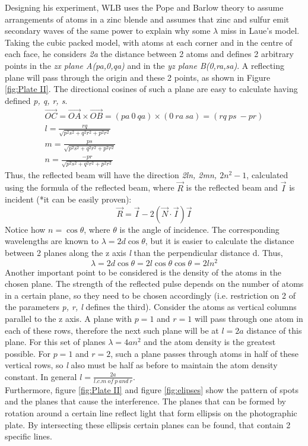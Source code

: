 \documentclass[14pt]{article}
\begin{document}
Designing his experiment, WLB uses the Pope and Barlow theory to assume arrangements of atoms in a zinc blende and assumes that zinc and sulfur emit secondary waves of the same power to explain why some $\lambda$ miss in Laue’s model. Taking the cubic packed model, with atoms at each corner and in the centre of each face, he considers \textit{2a} the distance between 2 atoms and defines 2 arbitrary points in the \textit{zx plane A(pa,0,qa)} and in the \textit{yz plane B(0,ra,sa)}. A reflecting plane will pass through the origin and these 2 points, as shown in Figure \ref{fig:Plate II}. The directional cosines of such a plane are easy to calculate having defined \textit{p, q, r, s}.
\begin{gather*}
    \vec{OC}=\vec{OA}\times\vec{OB}=(pa\ 0\ qa) \times (0\ ra\ sa)=(rq\ ps\ -pr)\\ 
    l=\frac{rq}{\sqrt{p^2s^2+q^2r^2+p^2r^2}}\\ 
    m=\frac{ps}{\sqrt{p^2s^2+q^2r^2+p^2r^2}}\\
    n=\frac{-pr}{\sqrt{p^2s^2+q^2r^2+p^2r^2}}
\end{gather*}
Thus, the reflected beam will have the direction \textit{2ln, 2mn, $2n^2-1$}, calculated using the formula of the reflected beam, where $\vec{R}$ is the reflected beam and $\vec{I}$ is incident (*it can be easily proven):
$$\vec{R}=\vec{I}-2(\vec{N}\cdot\vec{I})\vec{I}$$
Notice how $n=\cos{\theta}$, where $\theta$ is the angle of incidence. The corresponding wavelengths are known to $\lambda=2d\cos{\theta}$, but it is easier to calculate the distance between 2 planes along the z axis \textit{l} than the perpendicular distance d. Thus,
$$\lambda=2d\cos{\theta}=2l\cos{\theta}\cos{\theta}=2ln^2$$
Another important point to be considered is the density of the atoms in the chosen plane. The strength of the reflected pulse depends on the number of atoms in a certain plane, so they need to be chosen accordingly (i.e. restriction on 2 of the parameters \textit{p, r, l} defines the third). Consider the atoms as vertical columns parallel to the z axis. A plane with $p=1$ and $r=1$ will pass through one atom in each of these rows, therefore the next such plane will be at $l=2a$ distance of this plane. For this set of planes $\lambda=4an^2$ and the atom density is the greatest possible. For $p=1$ and $r=2$, such a plane passes through atoms in half of these vertical rows, so \textit{l} also must be half as before to maintain the atom density constant. In general $l=\frac{2a}{l.c.m\ of\ p\ and\ r}$.\\
Furthermore, figure \ref{fig:Plate II} and figure \ref{fig:elipses} show the pattern of spots and the planes that cause the interference. The planes that can be formed by rotation around a certain line reflect light that form ellipsis on the photographic plate. By intersecting these ellipsis certain planes can be found, that contain 2 specific lines.
\end{document}
